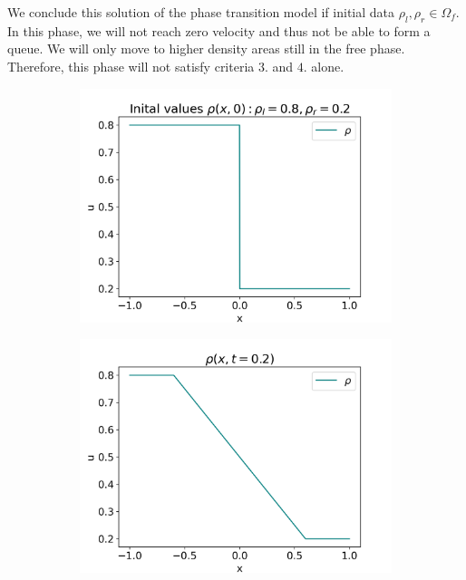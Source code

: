 \documentclass[10pt]{article}
\numberwithin{equation}{section}
\begin{document}
We conclude this solution of the phase transition model if initial data $\rho_l, \rho_r \in \Omega_f$. In this phase, we will not reach zero velocity and thus not be able to form a queue. We will only move to higher density areas still in the free phase. Therefore, this phase will not satisfy criteria $3.$ and $4.$ alone.  

\begin{figure} \centering
    
\end{figure}

\begin{figure}
     \centering
     \begin{subfigure}[b]{0.3\textwidth}
         \centering
         \includegraphics[width=\textwidth]{Figures/Model/RarefacIV.png}
     \end{subfigure}
     \hfill
     \begin{subfigure}[b]{0.3\textwidth}
         \centering
         \includegraphics[width=\textwidth]{Figures/Model/RarefacAtTime.png}

\end{subfigure}
\end{figure}
\end{document}
